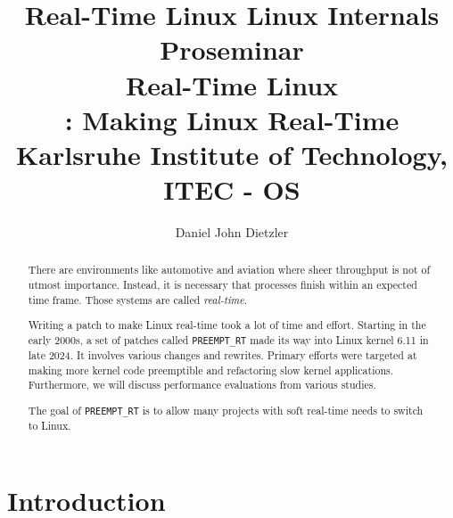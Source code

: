 \documentclass[10pt,twocolumn,a4paper]{article}
\begin{document}


\title{Real-Time Linux}

\title{%
{\normalfont \normalsize Linux Internals Proseminar}\\%
Real-Time Linux \\%
{\normalfont \normalsize {}: Making Linux Real-Time}\\%
{\normalfont \small
Karlsruhe Institute of Technology, ITEC - OS
}%
}

\author{Daniel John Dietzler}

\newcommand{\code}[1]{{\tt \small{#1}}}

\maketitle

\begin{abstract}
  There are environments like automotive and aviation where sheer throughput is not of utmost importance.
  Instead, it is necessary that processes finish within an expected time frame.
  Those systems are called \emph{real-time}.

  Writing a patch to make Linux real-time took a lot of time and effort.
  Starting in the early 2000s, a set of patches called \code{PREEMPT\_RT} made its way into Linux kernel 6.11 in late 2024.
  It involves various changes and rewrites.
  Primary efforts were targeted at making more kernel code preemptible and refactoring slow kernel applications.
  Furthermore, we will discuss performance evaluations from various studies.

  The goal of \code{PREEMPT\_RT} is to allow many projects with soft real-time needs to switch to Linux.
\end{abstract}

\section{Introduction}\label{sec:introduction}
\end{document}
